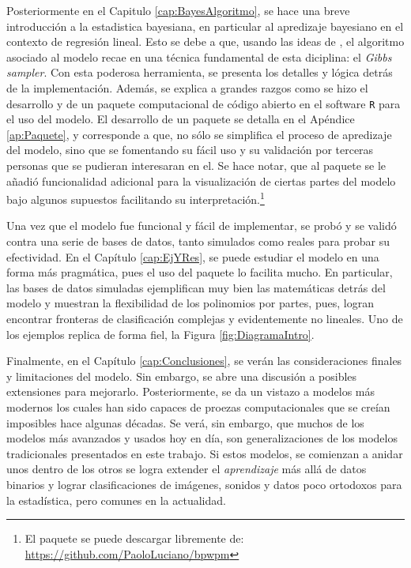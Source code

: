 \documentclass[../Main/Main.tex]{subfiles}
\begin{document}
Posteriormente en el Capitulo \ref{cap:BayesAlgoritmo}, se hace una breve introducción a la estadistica bayesiana, en particular al apredizaje bayesiano en el contexto de regresión lineal. Esto se debe a que, usando las ideas de \citet{albert1993bayesian}, el algoritmo asociado al modelo recae en una técnica fundamental de esta diciplina: el \textit{Gibbs sampler}. Con esta poderosa herramienta, se presenta los detalles y lógica detrás de la implementación. Además, se explica a grandes razgos como se hizo el desarrollo y de un paquete computacional de código abierto en el software \verb|R| para el uso del modelo. El desarrollo de un paquete se detalla en el Apéndice \ref{ap:Paquete}, y corresponde a que, no sólo se simplifica el proceso de apredizaje del modelo, sino que se fomentando su fácil uso y su validación por terceras personas que se pudieran interesaran en el. Se hace notar, que al paquete se le añadió funcionalidad adicional para la visualización de ciertas partes del modelo bajo algunos supuestos facilitando su interpretación.\footnote{El paquete se puede descargar libremente de: \url{https://github.com/PaoloLuciano/bpwpm}}


Una vez que el modelo fue funcional y fácil de implementar, se probó y se validó contra una serie de bases de datos, tanto simulados como reales para probar su efectividad. En el Capítulo \ref{cap:EjYRes}, se puede estudiar el modelo en una forma más pragmática, pues el uso del paquete lo facilita mucho. En particular, las bases de datos simuladas ejemplifican muy bien las matemáticas detrás del modelo y muestran la flexibilidad de los polinomios por partes, pues, logran encontrar fronteras de clasificación complejas y evidentemente no lineales. Uno de los ejemplos replica de forma fiel, la Figura \ref{fig:DiagramaIntro}.

Finalmente, en el Capítulo \ref{cap:Conclusiones}, se verán las consideraciones finales y limitaciones del modelo. Sin embargo, se abre una discusión a posibles extensiones para mejorarlo. Posteriormente, se da un vistazo a modelos más modernos los cuales han sido capaces de proezas computacionales que se creían imposibles hace algunas décadas. Se verá, sin embargo, que muchos de los modelos más avanzados y usados hoy en día, son generalizaciones de los modelos tradicionales presentados en este trabajo. Si estos modelos, se comienzan a anidar unos dentro de los otros se logra extender el \textit{aprendizaje} más allá de datos binarios y lograr clasificaciones de imágenes, sonidos y datos poco ortodoxos para la estadística, pero comunes en la actualidad. 
\end{document}
